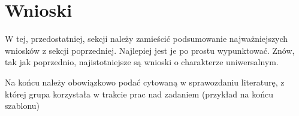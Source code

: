 \documentclass{classrep}
\begin{document}
\section{Wnioski}
{\color{blue}W tej, przedostatniej, sekcji należy zamieścić podsumowanie
najważniejszych wniosków z sekcji poprzedniej. Najlepiej jest je po prostu
wypunktować. Znów, tak jak poprzednio, najistotniejsze są wnioski o
charakterze uniwersalnym.}


\begin{thebibliography}{0}
\end{thebibliography}
{\color{blue} 
Na końcu należy obowiązkowo podać cytowaną w sprawozdaniu
literaturę, z której grupa korzystała w trakcie prac nad zadaniem (przykład na
końcu szablonu)}
\end{document}
